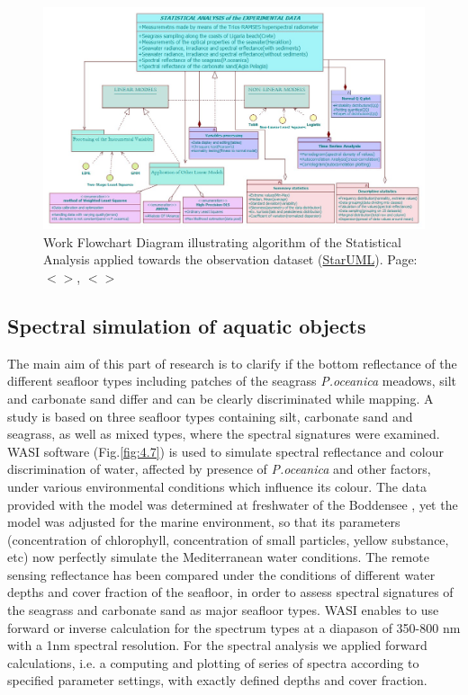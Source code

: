 \documentclass[11pt]{article}
\begin{document}
\begin{figure}[H]
	\centering
	\includegraphics[scale=0.5, angle=90]{UML_StatAn.jpg}
	\caption{Work Flowchart Diagram illustrating algorithm of the Statistical Analysis applied towards the observation dataset (\href{http://staruml.sourceforge.net/en/}{StarUML}). Page: $<$\pageref{page-40}$>$, $<$\pageref{stan}$>$}
	\label{fig:4.12}
\end{figure}

\subsection{Spectral simulation of aquatic objects}\label{page-35}
The main aim of this part of research is to clarify if the bottom reflectance of the different seafloor types including patches of
the seagrass \textit{P.oceanica} meadows, silt and carbonate sand differ and can be clearly discriminated while mapping. A study is
based on three seafloor types containing silt, carbonate sand and seagrass, as well as mixed
types, where the spectral signatures were examined. \ac{WASI} software (Fig.\ref{fig:4.7}) is used to simulate
spectral reflectance and colour discrimination of water, affected by presence of \textit{P.oceanica} and other factors, under various
environmental conditions which influence its colour.
The data provided with the model was determined at freshwater of the Boddensee \cite{Gege05}\label{Gege05}, 
yet the model was adjusted for the marine environment, so that its parameters (concentration of chlorophyll, concentration of small particles,
yellow substance, etc) now perfectly simulate the Mediterranean water conditions.
The remote sensing reflectance has been compared under the conditions of different water depths and
cover fraction of the seafloor, in order to assess spectral signatures of the seagrass and carbonate sand
as major seafloor types. \ac{WASI} enables to use forward or inverse calculation for the spectrum types at
a diapason of 350-800 nm with a 1nm spectral resolution. For the spectral analysis we applied
forward calculations, i.e. a computing and plotting of series of spectra according to specified
parameter settings, with exactly defined depths and cover fraction. 
\end{document}
